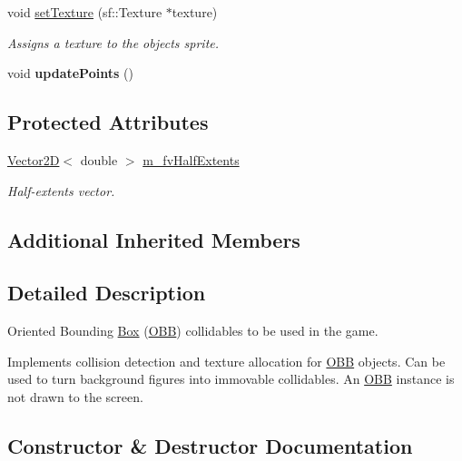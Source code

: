 \begin{DoxyCompactItemize}
\item 
void \hyperlink{class_o_b_b_a9d0c690a6d3825865b8dd4e023a7cec3}{set\+Texture} (sf\+::\+Texture $\ast$texture)
\begin{DoxyCompactList}\small\item\em Assigns a texture to the object\textquotesingle{}s sprite. \end{DoxyCompactList}\item 
\hypertarget{class_o_b_b_a3103d775e6ba4b27a80263ea14826309}{}void {\bfseries update\+Points} ()\label{class_o_b_b_a3103d775e6ba4b27a80263ea14826309}

\end{DoxyCompactItemize}
\subsection*{Protected Attributes}
\begin{DoxyCompactItemize}
\item 
\hypertarget{class_o_b_b_a9bb0b948899d85dd6973d7526a574cc2}{}\hyperlink{class_vector2_d}{Vector2\+D}$<$ double $>$ \hyperlink{class_o_b_b_a9bb0b948899d85dd6973d7526a574cc2}{m\+\_\+fv\+Half\+Extents}\label{class_o_b_b_a9bb0b948899d85dd6973d7526a574cc2}

\begin{DoxyCompactList}\small\item\em Half-\/extents vector. \end{DoxyCompactList}\end{DoxyCompactItemize}
\subsection*{Additional Inherited Members}


\subsection{Detailed Description}
Oriented Bounding \hyperlink{class_box}{Box} (\hyperlink{class_o_b_b}{O\+B\+B}) collidables to be used in the game. 

Implements collision detection and texture allocation for \hyperlink{class_o_b_b}{O\+B\+B} objects. Can be used to turn background figures into immovable collidables. An \hyperlink{class_o_b_b}{O\+B\+B} instance is not drawn to the screen. 

\subsection{Constructor \& Destructor Documentation}
\hypertarget{class_o_b_b_af752af068c6fc1787f06556b6a71c929}{}
